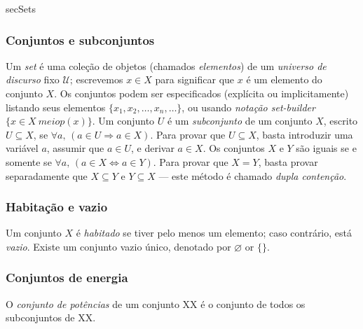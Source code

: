 \begin{tldr}{secSets}

\subsubsection*{Conjuntos e subconjuntos}

\begin{tldrlist}
 Um \textit{set} é uma coleção de objetos (chamados \textit{elementos}) de um \textit{universo de discurso} fixo $\mathcal{U}$; escrevemos $x \in X$ para significar que $x$ é um elemento do conjunto $X$. Os conjuntos podem ser especificados (explícita ou implicitamente) listando seus elementos $\{ x_1, x_2, \dots, x_n, \dots \}$, ou usando \textit{notação set-builder} $\{ x \in X \ meio p(x) \}$.
 Um conjunto $U$ é um \textit{subconjunto} de um conjunto $X$, escrito $U \subseteq X$, se $\forall a,\, (a \in U \Rightarrow a \in X)$. Para provar que $U \subseteq X$, basta introduzir uma variável $a$, assumir que $a \in U$, e derivar $a \in X$.
 Os conjuntos $X$ e $Y$ são iguais se e somente se $\forall a,\, (a \in X \Leftrightarrow a \in Y)$. Para provar que $X = Y$, basta provar separadamente que $X \subseteq Y$ e $Y \subseteq X$ --- este método é chamado \textit{dupla contenção}.
\end{tldrlist}

\subsubsection*{Habitação e vazio}

\begin{tldrlist}
 Um conjunto $X$ é \textit{habitado} se tiver pelo menos um elemento; caso contrário, está \textit{vazio}.
 Existe um conjunto vazio único, denotado por $\varnothing$ or $\{ \}$.
\end{tldrlist}

\subsubsection*{Conjuntos de energia}
\begin{tldrlist}
 O \textit{conjunto de potências} de um conjunto XX é o conjunto de todos os subconjuntos de XX.
\end{tldrlist}
\end{tldr}

